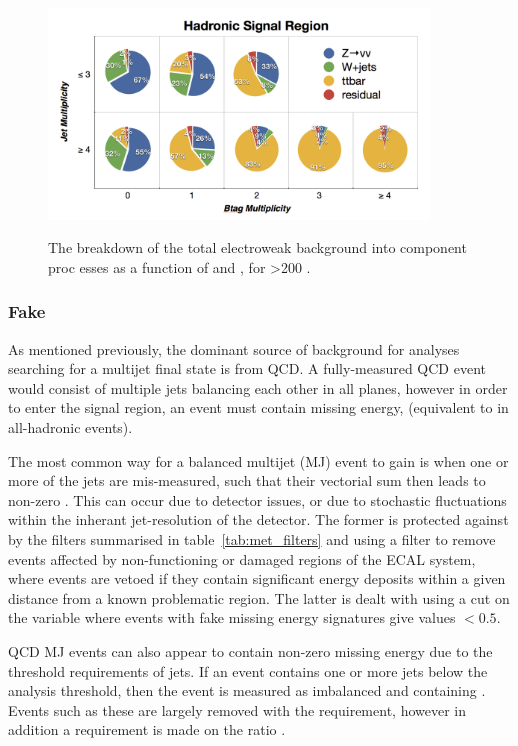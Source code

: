 \begin{figure}[hb!]
\centering
\hspace{0cm}\includegraphics[width=0.9\textwidth, trim=0 00 0 0, clip=true]
{Figs/ra1_had_bg_comp_v3.png}
\label{fig:background_decomp}
\caption{The breakdown of the total electroweak background into component proc
esses as a function of \nj and \nb, for \HT>200 \gev.}
\end{figure}

\subsubsection{Fake \met}

As mentioned previously, the dominant source of background for analyses 
searching for a multijet final state is from QCD. A fully-measured QCD event 
would consist of multiple jets balancing each other in all planes, however in 
order to enter the signal region, an event must contain missing energy, 
\mht (equivalent to \met in all-hadronic events).

The most common way for a balanced multijet (MJ) event to gain \mht is when one 
or more of the jets are mis-measured, such that their vectorial sum then leads to non-zero
\mht. This can occur due to detector issues, or due to stochastic fluctuations
within
the inherant jet-resolution of the 
detector. The former is protected against by the \met filters summarised in 
table~\ref{tab:met_filters} and using a filter to remove events
affected by non-functioning or damaged regions of the ECAL system, where 
events are vetoed if they contain significant energy deposits within a given 
distance from a known problematic region. The latter is dealt with using a
cut on the \alphat variable where 
events with fake missing energy signatures give values $<0.5$.

QCD MJ events can also appear to contain non-zero missing energy 
due to the threshold requirements of jets. If an event contains 
one or more jets below the analysis threshold, then the 
event is measured as imbalanced and containing \mht. Events such as these are largely 
removed with the \alphat requirement, however in addition a requirement is made on the
ratio \mhtmet.

